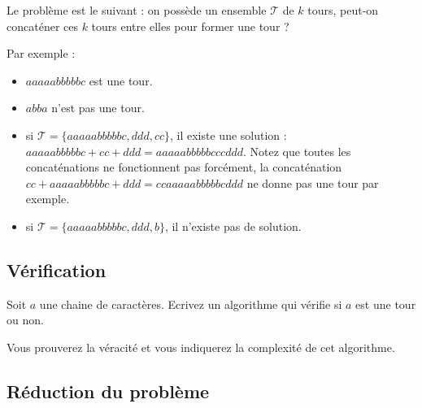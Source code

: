 \documentclass
[12pt]
{article}
\begin{document}
Le problème est le suivant : on possède un ensemble $\mathcal{T}$ de $k$ tours, peut-on concaténer ces $k$ tours entre elles pour former une tour ?

Par exemple :

\begin{itemize}
    \item $aaaaabbbbbc$ est une tour.
    \item $abba$ n'est pas une tour.
    \item si $\mathcal{T} = \{ aaaaabbbbbc, ddd, cc \}$, il existe une solution : $aaaaabbbbbc + cc + ddd = aaaaabbbbbcccddd$. Notez que toutes les concaténations ne fonctionnent pas forcément, la concaténation $cc + aaaaabbbbbc + ddd = ccaaaaabbbbbcddd$ ne donne pas une tour par exemple.
    \item si $\mathcal{T} = \{ aaaaabbbbbc, ddd, b \}$, il n'existe pas de solution.
\end{itemize}

\subsection{Vérification}

Soit $a$ une chaine de caractères. Ecrivez un algorithme qui vérifie si $a$ est une tour ou non.

Vous prouverez la véracité et vous indiquerez la complexité de cet algorithme.

\subsection{Réduction du problème}
\end{document}
